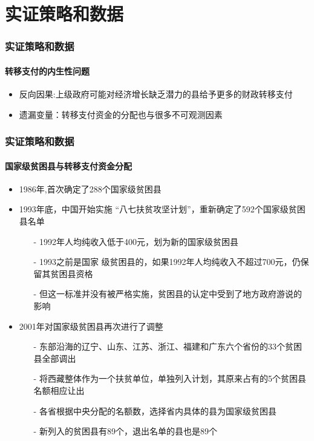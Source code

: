 \section{实证策略和数据} 
\begin{frame}[t]
\frametitle{实证策略和数据}
\framesubtitle{转移支付的内生性问题}
\begin{center}
	\begin{itemize}
	\item 反向因果:上级政府可能对经济增长缺乏潜力的县给予更多的财政转移支付
	\item 遗漏变量：转移支付资金的分配也与很多不可观测因素
\end{itemize}
\end{center}
\end{frame}

\begin{frame}[t]
	\frametitle{实证策略和数据}
	\framesubtitle{国家级贫困县与转移支付资金分配}
{\small 	\begin{center}
		\begin{itemize}
			\item 1986年,首次确定了288个国家级贫困县
			\item 1993年底，中国开始实施 “八七扶贫攻坚计划”，重新确定了592个国家级贫困县名单
			\begin{itemize}
				\item[-] 1992年人均纯收入低于400元，划为新的国家级贫困县
				\item[-] 1993之前是国家
				级贫困县的，如果1992年人均纯收入不超过700元，仍保留其贫困县资格
				\item[-] 但这一标准并没有被严格实施，贫困县的认定中受到了地方政府游说的影响
			\end{itemize}
		\item 2001年对国家级贫困县再次进行了调整
		\begin{itemize}
			\item[-] 东部沿海的辽宁、山东、江苏、浙江、福建和广东六个省份的33个贫困县全部调出
			\item[-] 将西藏整体作为一个扶贫单位，单独列入计划，其原来占有的5个贫困县名额相应让出
			\item[-] 各省根据中央分配的名额数，选择省内具体的县为国家级贫困县
			\item[-] 新列入的贫困县有89个，退出名单的县也是89个
		\end{itemize}
		\end{itemize}
	\end{center}}
\end{frame}


